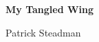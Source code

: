 \documentclass[12pt]{memoir}
\begin{document}
\vspace*{\fill}
\begin{adjustwidth}{1in}{1in}
\begin{center}
\HUGE \textbf{My Tangled Wing}
\end{center}
\bigskip
\begin{center}
\LARGE{Patrick Steadman}\par
\end{center}
\end{adjustwidth}
\vspace*{\fill}

{}


%

%

%

%


\end{document}
